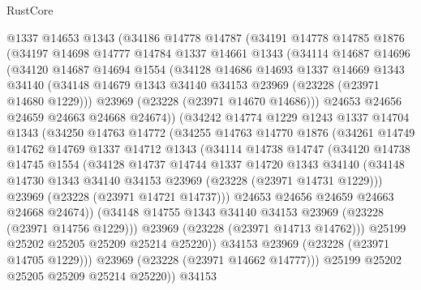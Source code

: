 \begin{lexlean}{RustCore}
\begin{coremodule}
    @1337
    @14653
    @1343
    (@34186
      @14778
      @14787
      (@34191
        @14778
        @14785
        @1876
        (@34197
          @14698
          @14777
          @14784
          @1337
          @14661
          @1343
          (@34114
            @14687
            @14696
            (@34120
              @14687
              @14694
              @1554
              (@34128
                @14686
                @14693
                @1337
                @14669
                @1343
                @34140
                (@34148 @14679 @1343 @34140 @34153 @23969 (@23228 (@23971 @14680 @1229)))
                @23969
                (@23228 (@23971 @14670 @14686)))
              @24653
              @24656
              @24659
              @24663
              @24668
              @24674))
          (@34242
            @14774
            @1229
            @1243
            @1337
            @14704
            @1343
            (@34250
              @14763
              @14772
              (@34255
                @14763
                @14770
                @1876
                (@34261
                  @14749
                  @14762
                  @14769
                  @1337
                  @14712
                  @1343
                  (@34114
                    @14738
                    @14747
                    (@34120
                      @14738
                      @14745
                      @1554
                      (@34128
                        @14737
                        @14744
                        @1337
                        @14720
                        @1343
                        @34140
                        (@34148 @14730 @1343 @34140 @34153 @23969 (@23228 (@23971 @14731 @1229)))
                        @23969
                        (@23228 (@23971 @14721 @14737)))
                      @24653
                      @24656
                      @24659
                      @24663
                      @24668
                      @24674))
                  (@34148 @14755 @1343 @34140 @34153 @23969 (@23228 (@23971 @14756 @1229)))
                  @23969
                  (@23228 (@23971 @14713 @14762)))
                @25199
                @25202
                @25205
                @25209
                @25214
                @25220))
            @34153
            @23969
            (@23228 (@23971 @14705 @1229)))
          @23969
          (@23228 (@23971 @14662 @14777)))
        @25199
        @25202
        @25205
        @25209
        @25214
        @25220))
    @34153

\end{coremodule}
\end{lexlean}
